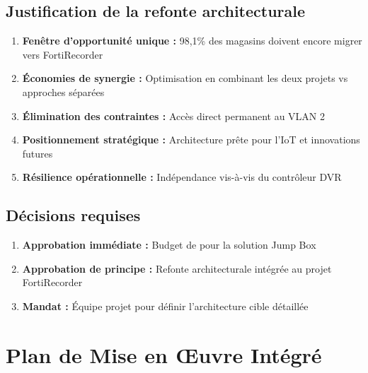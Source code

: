 \documentclass{dollarama}
\begin{document}
\subsection{Justification de la refonte architecturale}

\begin{enumerate}
\item \textbf{Fenêtre d'opportunité unique :} 98,1\% des magasins doivent encore migrer vers FortiRecorder
\item \textbf{Économies de synergie :} Optimisation en combinant les deux projets vs approches séparées
\item \textbf{Élimination des contraintes :} Accès direct permanent au VLAN 2
\item \textbf{Positionnement stratégique :} Architecture prête pour l'IoT et innovations futures
\item \textbf{Résilience opérationnelle :} Indépendance vis-à-vis du contrôleur DVR
\end{enumerate}


\subsection{Décisions requises}

\begin{enumerate}
\item \textbf{Approbation immédiate :} Budget de  pour la solution Jump Box
\item \textbf{Approbation de principe :} Refonte architecturale intégrée au projet FortiRecorder
\item \textbf{Mandat :} Équipe projet pour définir l'architecture cible détaillée
\end{enumerate}



\section{Plan de Mise en Œuvre Intégré}

\end{document}
